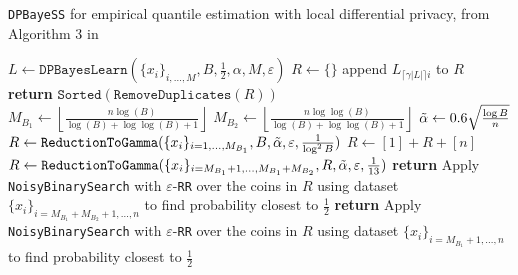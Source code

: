 \begin{algorithm*}[t]
\caption{\texttt{DPBayeSS} for empirical quantile estimation with local differential privacy, from Algorithm 3 in \cite{gretta2023sharp}}\label{alg: DPBayeSS}
\begin{algorithmic}[1]
\STATE $L\gets \texttt{DPBayesLearn}(\{x_{i}\}_{i,\dots,M}, B, \frac{1}{2}, \alpha, M, \varepsilon)$ 
\STATE $R\gets \{\}$
    \STATE append $L_{\lceil\gamma |L| \rceil i}$ to $R$
\ENDFOR
\STATE \textbf{return} $\texttt{Sorted}(\texttt{RemoveDuplicates}(R))$
\ENDFUNCTION\\
\hspace{0.5 cm}
\STATE $M_{B_1} \gets \left\lfloor\frac{n \log(B)}{\log(B)+\log\log(B)+1}\right\rfloor$
\STATE $M_{B_2} \gets \left\lfloor\frac{n \log\log(B)}{\log(B)+\log\log(B)+1}\right\rfloor$
\STATE $\Tilde{\alpha} \gets 0.6 \sqrt{\frac{\log B}{n}}$ 
\STATE $R\gets \texttt{ReductionToGamma}(\{x_{i}\}_{i=1,\dots, M_{B_1}}, B, \Tilde{\alpha}, \varepsilon, \frac{1}{\log^2B})$
    \STATE $R\gets [1]+R+[n]$ 
    \STATE $R \gets \texttt{ReductionToGamma}(\{x_{i}\}_{i=M_{B_1}+1,\dots, M_{B_1}+M_{B_2}}, R, \Tilde{\alpha}, \varepsilon, \frac{1}{13})$ 
    \STATE \textbf{return } Apply \texttt{NoisyBinarySearch} with $\varepsilon$-\texttt{RR} over the coins in $R$ using dataset $\{x_i\}_{i=M_{B_1}+M_{B_2}+1,\dots, n}$ to find probability closest to $\frac{1}{2}$
\ELSE
        \STATE \textbf{return } Apply \texttt{NoisyBinarySearch} with $\varepsilon$-\texttt{RR} over the coins in $R$ using dataset $\{x_i\}_{i=M_{B_1}+1,\dots, n}$ to find probability closest to $\frac{1}{2}$
\ENDIF
\ENDFUNCTION
\end{algorithmic}
\end{algorithm*}